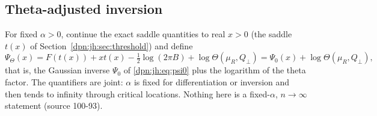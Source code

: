 \documentclass[11pt]{article}
\numberwithin{equation}{section}
\theoremstyle{definition}\newtheorem{definition}[theorem]{Definition}
\theoremstyle{remark}\newtheorem{remark}[theorem]{Remark}
\newcommand{\src}[1]{\textup{(source #1)}}
\begin{document}
\subsection{Theta-adjusted inversion}\label{dpn:ct:sec:inverse}
For fixed $\alpha>0$, continue the exact saddle quantities to real $x>0$ (the
saddle $t(x)$ of Section~\ref{dpn:jh:sec:threshold}) and define
\begin{equation}\label{dpn:ct:eq:PsiTheta}
 \Psi_\Theta(x)=F(t(x))+xt(x)-\tfrac12\log(2\pi B)+\log\Theta(\mu_R,Q_\perp)
 =\Psi_0(x)+\log\Theta(\mu_R,Q_\perp),
\end{equation}
that is, the Gaussian inverse $\Psi_0$ of \eqref{dpn:jh:eq:psi0} plus the
logarithm of the theta factor.  The quantifiers are joint: $\alpha$ is fixed
for differentiation or inversion and then tends to infinity through critical
locations.  Nothing here is a fixed-$\alpha$, $n\to\infty$ statement
\src{100-93}.
\end{document}
